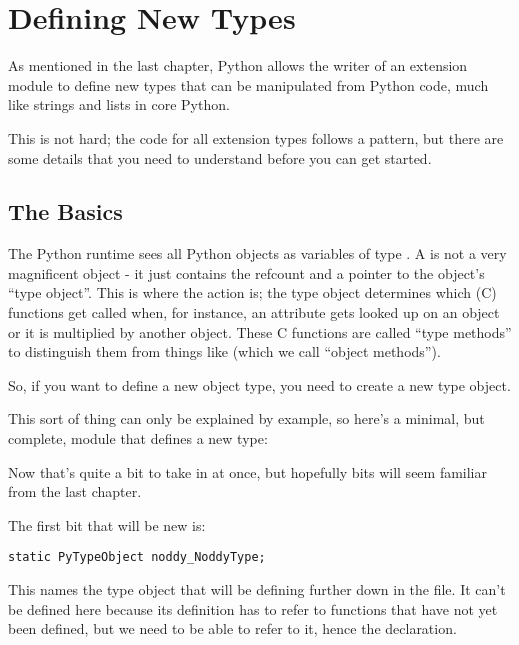 \chapter{Defining New Types
        \label{defining-new-types}}

As mentioned in the last chapter, Python allows the writer of an
extension module to define new types that can be manipulated from
Python code, much like strings and lists in core Python.

This is not hard; the code for all extension types follows a pattern,
but there are some details that you need to understand before you can
get started.

\section{The Basics
    \label{dnt-basics}}

The Python runtime sees all Python objects as variables of type
.  A  is not a very magnificent
object - it just contains the refcount and a pointer to the object's
``type object''.  This is where the action is; the type object
determines which (C) functions get called when, for instance, an
attribute gets looked up on an object or it is multiplied by another
object.  These C functions are called ``type methods'' to distinguish
them from things like  (which we call ``object
methods'').

So, if you want to define a new object type, you need to create a new
type object.

This sort of thing can only be explained by example, so here's a
minimal, but complete, module that defines a new type:



Now that's quite a bit to take in at once, but hopefully bits will
seem familiar from the last chapter.

The first bit that will be new is:

\begin{verbatim}
static PyTypeObject noddy_NoddyType;
\end{verbatim}

This names the type object that will be defining further down in the
file.  It can't be defined here because its definition has to refer to
functions that have not yet been defined, but we need to be able to
refer to it, hence the declaration.

